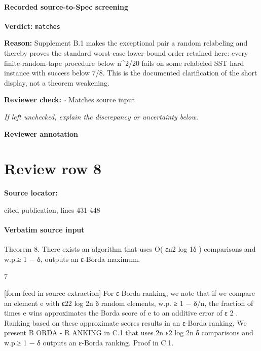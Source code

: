 \documentclass[10pt]{article}
\newcommand{\reviewerbox}{%
  \par\noindent\fbox{\parbox{0.96\linewidth}{\rule{0pt}{0.38in}}}\par
}
\newcommand{\reviewmatch}[1]{%
  \par\noindent\textbf{Reviewer check:} $\square$\; #1\par
  \noindent\emph{If left unchecked, explain the discrepancy or uncertainty below.}\par
}
\begin{document}
\paragraph{Recorded source-to-Spec screening}
\textbf{Verdict:} \texttt{matches}
\\
{\raggedright
\textbf{Reason:} Supplement B.\allowbreak{}1 makes the exceptional pair a random relabeling and thereby proves the standard worst-\allowbreak{}case lower-\allowbreak{}bound order retained here:\allowbreak{} every finite-\allowbreak{}random-\allowbreak{}tape procedure below n\textasciicircum{}2/\allowbreak{}20 fails on some relabeled SST hard instance with success below 7/\allowbreak{}8.\allowbreak{} This is the documented clarification of the short display, not a theorem weakening.\allowbreak{}
\par}
\reviewmatch{Matches source input}
\noindent\textbf{Reviewer annotation}\par
\reviewerbox
\clearpage
\hypertarget{source-claim-36b59fc8901b02b0}{}
\section*{Review row 8}
\textbf{Source locator:} {\footnotesize\raggedright cited publication, lines 431-\allowbreak{}448\par}
\paragraph{Verbatim source input}
\begin{ReviewVerbatim}
Theorem 8. There exists an algorithm that uses O( εn2 log 1δ ) comparisons and w.p.≥ 1 − δ, outputs
an ε-Borda maximum.


                                                     7

[form-feed in source extraction]
For ε-Borda ranking, we note that if we compare an element e with ε22 log 2n
                                                                           δ
                                                                             random elements, w.p.
≥ 1 − δ/n, the fraction of times e wins approximates the Borda score of e to an additive error of
 ε
2
   . Ranking based on these approximate scores results in an ε-Borda ranking. We present B ORDA -
R ANKING in C.1 that uses 2n
                           ε2
                              log 2n
                                   δ
                                     comparisons and w.p.≥ 1 − δ outputs an ε-Borda ranking. Proof
in C.1.
\end{ReviewVerbatim}
\end{document}
